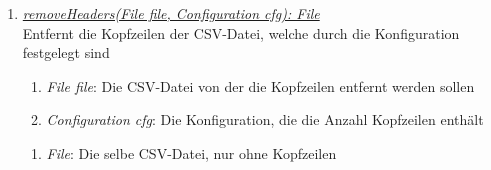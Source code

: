 \begin{enumerate}[+]
	\item \underline{\textit{removeHeaders(File file, Configuration cfg): File}} \\
	Entfernt die Kopfzeilen der CSV-Datei, welche durch die Konfiguration festgelegt sind
	\begin{enumerate}[$\bullet$]
		\item \textit{File file}: Die CSV-Datei von der die Kopfzeilen entfernt werden sollen
		\item \textit{Configuration cfg}: Die Konfiguration, die die Anzahl Kopfzeilen enthält
	\end{enumerate}
	\vspace{-0.2cm}
	\begin{enumerate}[$\circ$]
		\item \textit{File}: Die selbe CSV-Datei, nur ohne Kopfzeilen
	\end{enumerate}
\end{enumerate}
